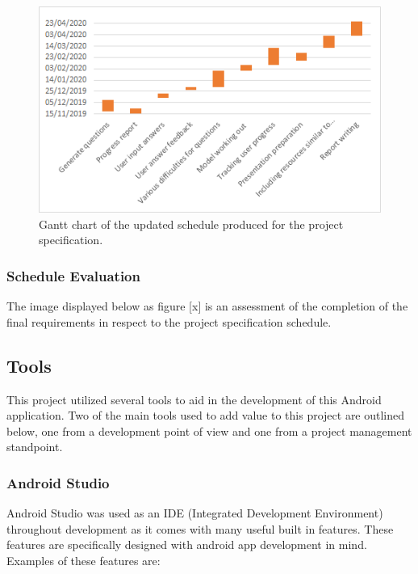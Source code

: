 \documentclass{article}
\begin{document}
\begin{figure}[H]
	\centering
	\includegraphics[width=0.9\linewidth]{./data/progressReportGanttChart.png}
	\caption{Gantt chart of the updated schedule produced for the project specification.}
	\label{figure:progressReportGanttChart}
\end{figure}

%
%
%

\subsubsection{Schedule Evaluation}

The image displayed below as figure [x] is an assessment of the completion of the final requirements in respect to the project specification schedule. 

%
%
%

\subsection{Tools}

This project utilized several tools to aid in the development of this Android application. Two of the main tools used to add value to this project are outlined below, one from a development point of view and one from a project management standpoint. 

\subsubsection{Android Studio}

Android Studio was used as an IDE (Integrated Development Environment) throughout development as it comes with many useful built in features. These features are specifically designed with android app development in mind. Examples of these features are: 
\end{document}
